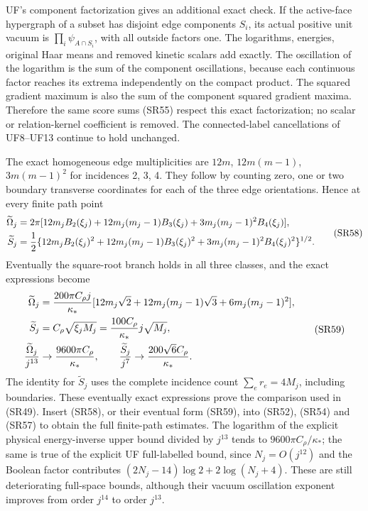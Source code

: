 \documentclass[11pt]{article}
\begin{document}
UF's component factorization gives an additional exact check. If the active-face hypergraph of a subset has disjoint edge components \(S_i\), its actual positive unit vacuum is \(\prod_i\psi_{A\cap S_i}\), with all outside factors one. The logarithms, energies, original Haar means and removed kinetic scalars add exactly. The oscillation of the logarithm is the sum of the component oscillations, because each continuous factor reaches its extrema independently on the compact product. The squared gradient maximum is also the sum of the component squared gradient maxima. Therefore the same score sums (SR55) respect this exact factorization; no scalar or relation-kernel coefficient is removed. The connected-label cancellations of UF8–UF13 continue to hold unchanged.

The exact homogeneous edge multiplicities are \(12m\), \(12m(m-1)\), \(3m(m-1)^2\) for incidences 2, 3, 4. They follow by counting zero, one or two boundary transverse coordinates for each of the three edge orientations. Hence at every finite path point
\[
\begin{aligned}
\widetilde\Omega_j
&=2\pi[12m_jB_2(\xi_j)+12m_j(m_j-1)B_3(\xi_j)
+3m_j(m_j-1)^2B_4(\xi_j)],\\
\widetilde S_j
&={1\over2}\{12m_jB_2(\xi_j)^2+12m_j(m_j-1)B_3(\xi_j)^2
+3m_j(m_j-1)^2B_4(\xi_j)^2\}^{1/2}.
\end{aligned}\tag{SR58}
\]
Eventually the square-root branch holds in all three classes, and the exact expressions become
\[
\begin{aligned}
\widetilde\Omega_j
&={200\pi C_\rho j\over\kappa_*}
[12m_j\sqrt2+12m_j(m_j-1)\sqrt3+6m_j(m_j-1)^2],\\
\widetilde S_j&=C_\rho\sqrt{\xi_jM_j}
={100C_\rho\over\kappa_*}j\sqrt{M_j},\\
{\widetilde\Omega_j\over j^{13}}&\to{9600\pi C_\rho\over\kappa_*},\qquad
{\widetilde S_j\over j^7}\to{200\sqrt6C_\rho\over\kappa_*}.
\end{aligned}\tag{SR59}
\]
The identity for \(\widetilde S_j\) uses the complete incidence count \(\sum_er_e=4M_j\), including boundaries. These eventually exact expressions prove the comparison used in (SR49). Insert (SR58), or their eventual form (SR59), into (SR52), (SR54) and (SR57) to obtain the full finite-path estimates. The logarithm of the explicit physical energy-inverse upper bound divided by \(j^{13}\) tends to \(9600\pi C_\rho/\kappa_*\); the same is true of the explicit UF full-labelled bound, since \(N_j=O(j^{12})\) and the Boolean factor contributes \((2N_j-14)\log2+2\log(N_j+4)\). These are still deteriorating full-space bounds, although their vacuum oscillation exponent improves from order \(j^{14}\) to order \(j^{13}\).
\end{document}
